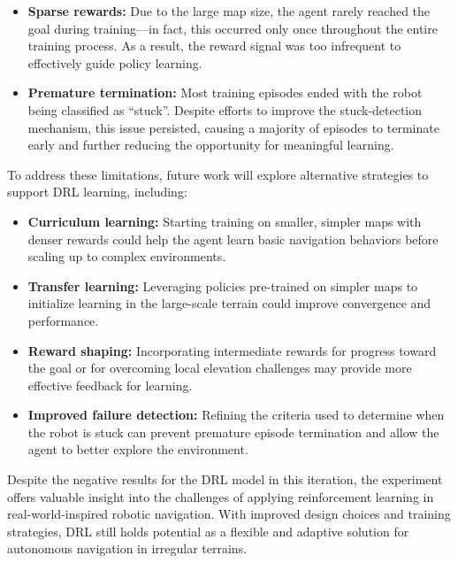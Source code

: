 \documentclass[conference]{IEEEtran}
\begin{document}
\begin{itemize}
    \item \textbf{Sparse rewards:} Due to the large map size, the agent rarely reached the goal during training---in fact, this occurred only once throughout the entire training process. As a result, the reward signal was too infrequent to effectively guide policy learning.
    
    \item \textbf{Premature termination:} Most training episodes ended with the robot being classified as ``stuck''. Despite efforts to improve the stuck-detection mechanism, this issue persisted, causing a majority of episodes to terminate early and further reducing the opportunity for meaningful learning.
\end{itemize}

To address these limitations, future work will explore alternative strategies to support DRL learning, including:

\begin{itemize}
    \item \textbf{Curriculum learning:} Starting training on smaller, simpler maps with denser rewards could help the agent learn basic navigation behaviors before scaling up to complex environments.
    
    \item \textbf{Transfer learning:} Leveraging policies pre-trained on simpler maps to initialize learning in the large-scale terrain could improve convergence and performance.
    
    \item \textbf{Reward shaping:} Incorporating intermediate rewards for progress toward the goal or for overcoming local elevation challenges may provide more effective feedback for learning.
    
    \item \textbf{Improved failure detection:} Refining the criteria used to determine when the robot is stuck can prevent premature episode termination and allow the agent to better explore the environment.
\end{itemize}

Despite the negative results for the DRL model in this iteration, the experiment offers valuable insight into the challenges of applying reinforcement learning in real-world-inspired robotic navigation. With improved design choices and training strategies, DRL still holds potential as a flexible and adaptive solution for autonomous navigation in irregular terrains.



\end{document}

